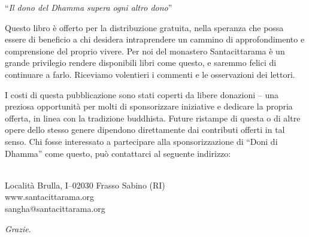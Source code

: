 
\thispagestyle{empty}

{\setlength{\parskip}{\baselineskip}
\centering

``\emph{\large Il dono del Dhamma supera ogni altro dono}''

Questo libro è offerto per la distribuzione gratuita, nella speranza che
possa essere di beneficio a chi desidera intraprendere un cammino di
approfondimento e comprensione del proprio vivere. Per noi del monastero
Santacittarama è un grande privilegio rendere disponibili libri come
questo, e saremmo felici di continuare a farlo. Riceviamo volentieri i
commenti e le osservazioni dei lettori.

I costi di questa pubblicazione sono stati coperti da libere donazioni
-- una preziosa opportunità per molti di sponsorizzare iniziative e
dedicare la propria offerta, in linea con la tradizione buddhista.
Future ristampe di questa o di altre opere dello stesso genere dipendono
direttamente dai contributi offerti in tal senso. Chi fosse interessato
a partecipare alla sponsorizzazione di ``Doni di Dhamma'' come questo,
può contattarci al seguente indirizzo:

\\[0.2\baselineskip]
Località Brulla, I--02030 Frasso Sabino (RI)\\
www.santacittarama.org\\
sangha@santacittarama.org

\emph{Grazie}.

}
